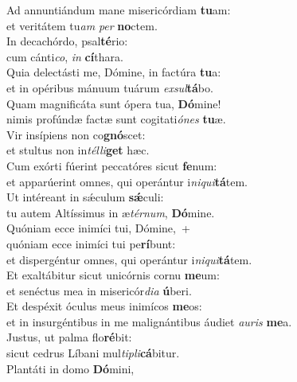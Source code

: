 \evenverse Ad annuntiándum mane misericórdiam \textbf{tu}am:~\*\\
\evenverse et veritátem tu\textit{am} \textit{per} \textbf{no}ctem.\\
\oddverse In decachórdo, psal\textbf{té}rio:~\*\\
\oddverse cum cánti\textit{co}, \textit{in} \textbf{cí}thara.\\
\evenverse Quia delectásti me, Dómine, in factúra \textbf{tu}a:~\*\\
\evenverse et in opéribus mánuum tuárum \textit{ex}\textit{sul}\textbf{tá}bo.\\
\oddverse Quam magnificáta sunt ópera tua, \textbf{Dó}mine!~\*\\
\oddverse nimis profúndæ factæ sunt cogitati\textit{ó}\textit{nes} \textbf{tu}æ.\\
\evenverse Vir insípiens non co\textbf{gnó}scet:~\*\\
\evenverse et stultus non in\textit{tél}\textit{li}\textbf{get} hæc.\\
\oddverse Cum exórti fúerint peccatóres sicut \textbf{fe}num:~\*\\
\oddverse et apparúerint omnes, qui operántur i\textit{ni}\textit{qui}\textbf{tá}tem.\\
\evenverse Ut intéreant in sǽculum \textbf{sǽ}culi:~\*\\
\evenverse tu autem Altíssimus in æ\textit{tér}\textit{num}, \textbf{Dó}mine.\\
\oddverse Quóniam ecce inimíci tui, Dómine,~+\\
\oddverse  quóniam ecce inimíci tui pe\textbf{rí}bunt:~\*\\
\oddverse et dispergéntur omnes, qui operántur i\textit{ni}\textit{qui}\textbf{tá}tem.\\
\evenverse Et exaltábitur sicut unicórnis cornu \textbf{me}um:~\*\\
\evenverse et senéctus mea in misericór\textit{di}\textit{a} \textbf{ú}beri.\\
\oddverse Et despéxit óculus meus inimícos \textbf{me}os:~\*\\
\oddverse et in insurgéntibus in me malignántibus áudiet \textit{au}\textit{ris} \textbf{me}a.\\
\evenverse Justus, ut palma flo\textbf{ré}bit:~\*\\
\evenverse sicut cedrus Líbani mul\textit{ti}\textit{pli}\textbf{cá}bitur.\\
\oddverse Plantáti in domo \textbf{Dó}mini,~\*\\
